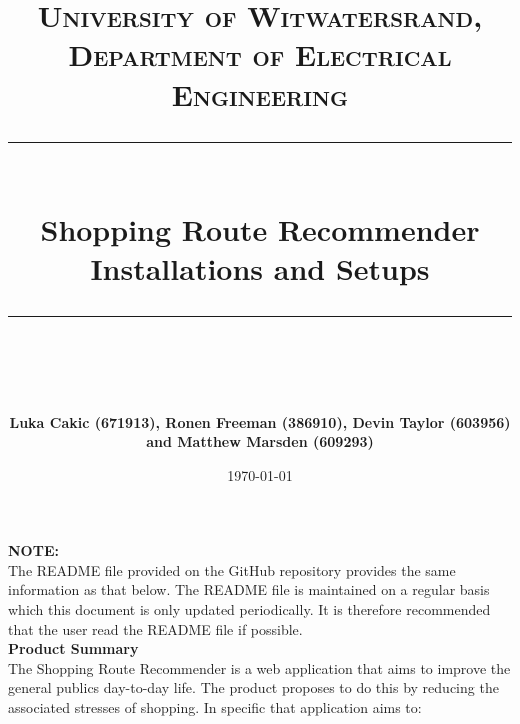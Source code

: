 \documentclass[10pt, a4paper, onecolumn]{scrartcl}
\begin{document}
	
	\newcommand{\horrule}[1]{\rule{\linewidth}{#1}}
	
	\title{\normalfont \normalsize
		\textsc{University of Witwatersrand, Department of Electrical Engineering} \\ [10pt]
		\horrule{0.5pt} \\ [10pt]
		\huge Shopping Route Recommender Installations and Setups \\
		\horrule{2pt} \\ [10pt]}
	\author{\textbf{\normalsize{Luka Cakic (671913), Ronen Freeman (386910), Devin Taylor (603956) and Matthew Marsden (609293)}} \\ [10pt]}
	\date {\normalsize \today}
	
	\maketitle
	
	
%		

	\textbf{NOTE:} \\
	
	The README file provided on the GitHub repository provides the same information as that below. The README file is maintained on a regular basis which this document is only updated periodically. It is therefore recommended that the user read the README file if possible.\\
	
	\textbf{Product Summary} \\
	
	The Shopping Route Recommender is a web application that aims to improve
	the general publics day-to-day life. The product proposes to do this by
	reducing the associated stresses of shopping. In specific that
	application aims to:
	
\end{document}
